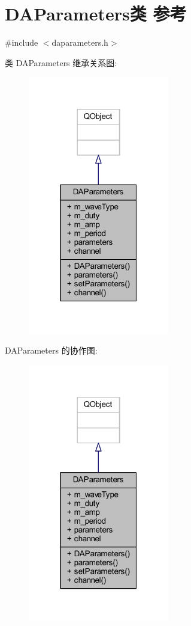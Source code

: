 \hypertarget{class_d_a_parameters}{}\section{D\+A\+Parameters类 参考}
\label{class_d_a_parameters}


{\ttfamily \#include $<$daparameters.\+h$>$}



类 D\+A\+Parameters 继承关系图\+:
\nopagebreak
\begin{figure}[H]
\begin{center}
\leavevmode
\includegraphics[width=175pt]{class_d_a_parameters__inherit__graph}
\end{center}
\end{figure}


D\+A\+Parameters 的协作图\+:
\nopagebreak
\begin{figure}[H]
\begin{center}
\leavevmode
\includegraphics[width=175pt]{class_d_a_parameters__coll__graph}
\end{center}
\end{figure}
